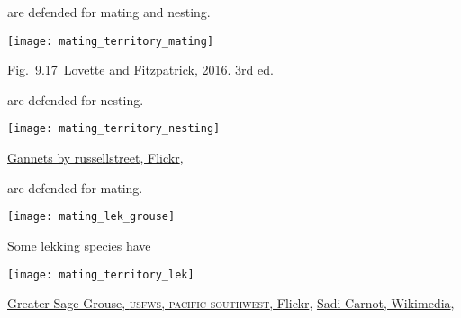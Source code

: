 \documentclass[t]{beamer}
\newcommand{\cornell}[1]{Fig.~#1~Lovette and Fitzpatrick, 2016. 3rd ed.}
\begin{document}

\begin{frame}[t]{ are defended for mating and nesting.}

\vspace{-0.5\baselineskip}

\centering
\texttt{[image: mating\_territory\_mating]}

\vfilll

\tinyfill \cornell{9.17}

\end{frame}


\begin{frame}[t]{ are defended for nesting.}

\vspace{-0.5\baselineskip}

\centering

\texttt{[image: mating\_territory\_nesting]}

\vfilll

\tinyfill \href{https://www.flickr.com/photos/27345927@N07/4542373073}{Gannets by russellstreet, Flickr}, 

\end{frame}


\begin{frame}[t]{ are defended for mating.}
\vspace{-0.5\baselineskip}

\begin{multicols}{2}

\noindent\texttt{[image: mating\_lek\_grouse]}

\hangpara Some lekking species have 

\columnbreak

\noindent\texttt{[image: mating\_territory\_lek]}

\end{multicols}

\vfilll

\tiny \href{https://www.flickr.com/photos/54430347@N04/6948123054}{Greater Sage-Grouse, \textsc{usfws, pacific southwest}, Flickr},  \hfill \href{https://en.wikipedia.org/wiki/File:Lek-diagram.jpg}{Sadi Carnot, Wikimedia}, 

\end{frame}
\end{document}
